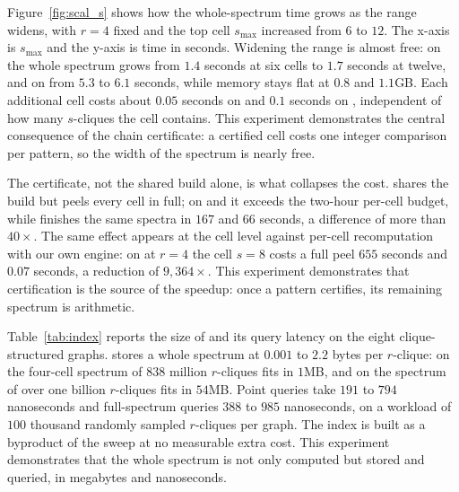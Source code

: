 Figure~\ref{fig:scal_s} shows how the whole-spectrum time grows as the range widens, with $r{=}4$ fixed and the top cell $s_{\max}$ increased from $6$ to $12$.
%
The x-axis is $s_{\max}$ and the y-axis is time in seconds.
%
Widening the range is almost free: on \daWIT{} the whole spectrum grows from $1.4$ seconds at six cells to $1.7$ seconds at twelve, and on \daDBL{} from $5.3$ to $6.1$ seconds, while memory stays flat at $0.8$ and $1.1$GB.
%
Each additional cell costs about $0.05$ seconds on \daWIT{} and $0.1$ seconds on \daDBL, independent of how many $s$-cliques the cell contains.
%
This experiment demonstrates the central consequence of the chain certificate: a certified cell costs one integer comparison per pattern, so the width of the spectrum is nearly free.

The certificate, not the shared build alone, is what collapses the cost.
%
\specndbase{} shares the build but peels every cell in full; on \daHEP{} and \daAST{} it exceeds the two-hour per-cell budget, while \specnd{} finishes the same spectra in $167$ and $66$ seconds, a difference of more than $40\times$.
%
The same effect appears at the cell level against per-cell recomputation with our own engine: on \daDBL{} at $r{=}4$ the cell $s{=}8$ costs a full peel $655$ seconds and \specnd{} $0.07$ seconds, a reduction of $9{,}364\times$.
%
This experiment demonstrates that certification is the source of the speedup: once a pattern certifies, its remaining spectrum is arithmetic.

Table~\ref{tab:index} reports the size of \nsi{} and its query latency on the eight clique-structured graphs.
%
\nsi{} stores a whole spectrum at $0.001$ to $2.2$ bytes per $r$-clique: on \daWUK{} the four-cell spectrum of $838$ million $r$-cliques fits in $1$MB, and on \daLDR{} the spectrum of over one billion $r$-cliques fits in $54$MB.
%
Point queries take $191$ to $794$ nanoseconds and full-spectrum queries $388$ to $985$ nanoseconds, on a workload of $100$ thousand randomly sampled $r$-cliques per graph.
%
The index is built as a byproduct of the sweep at no measurable extra cost.
%
This experiment demonstrates that the whole spectrum is not only computed but stored and queried, in megabytes and nanoseconds.

